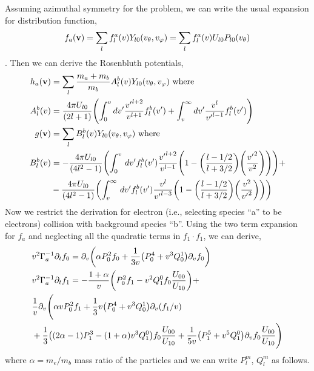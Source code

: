 \documentclass{article}[draft]
\begin{document}
Assuming azimuthal symmetry for the problem, we can write the usual expansion for distribution function, 
\begin{align*}
	f_a\of{\vect{v}} = \sum_{l} f^{a}_l\of{v} Y_{l0}\of{\vtheta, \vphi} = \sum_{l} f^{a}_l\of{v} U_{l0} P_{l0}\of{\vtheta}
\end{align*}. Then we can derive \cite{rosenbluth1957fokker} the Rosenbluth potentials, 
\begin{align*}
	h_a\of{\vect{v}} &= \sum_{l} \frac{m_a + m_b}{m_b} A^{b}_l\of{v} Y_{l0}\of{\vtheta, \vphi} \text{ where } \\
	A^{b}_l\of{v} &= \frac{4\pi U_{l0}}{(2l+1)}\of{\int_{0}^{v} dv^\prime \frac{{v^\prime}^{l+2}}{v^{l+1}} f^{b}_l\of{v^\prime} +  \int_{v}^{\infty} dv^\prime \frac{{v}^{l}}{{v^\prime}^{l-1}} f^{b}_l\of{v^\prime}}\\
	g\of{\vect{v}} & = \sum_{l} B^{b}_l\of{v} Y_{l0}\of{\vtheta, \vphi} \text{ where }\\
	B^{b}_{l}\of{v} & = -\frac{4\pi U_{l0}}{(4l^2-1)} \of
	{
		\int_{0}^{v} \diff{v^\prime} f^{b}_l\of{v^\prime} \frac{{v^\prime}^{l+2}}{v^{l-1}} \of{1 - \of{\frac{l-1/2}{l+3/2}}\of{\frac{{v^\prime}^2 }{v^2}}} } + \\
	&-\frac{4\pi U_{l0}}{(4l^2-1)} \of{
		\int_{v}^{\infty} \diff{v^\prime} f^{b}_l\of{v^\prime} \frac{{v}^{l}}{{v^\prime}^{l-3}} \of{1 - \of{\frac{l-1/2}{l+3/2}}\of{\frac{{v}^2 }{{v^\prime}^2}}}
	}
\end{align*}
\newpage
Now we restrict the derivation for electron (i.e., selecting species ``a'' to be electrons) collision with background species ``b''. Using the two term expansion for $f_a$ and neglecting all  the quadratic terms in $f_1 \cdot f_1$, we can derive, 
\begin{align*}
&v^2	\Gamma_a ^{-1} \partial_t f_0  = \partial_v \of {\alpha P^2_0 f_0 + \frac{1}{3v}\of{P^4_0 + v^3 Q^1_0} \partial_v f_0}\\
&v^2	\Gamma_a ^{-1} \partial_t f_1  = -\frac{1+\alpha}{v} \of{P^2_0 f_1 -v^2 Q^0_1 f_0 \frac{U_{00}}{U_{10}}} + \\
&\frac{1}{v}\partial_v \Bigg(\alpha v P^2_0 f_1 + \frac{1}{3} v\of{P^4_0 + v^3 Q^1_0} \partial_v \of{f_1/v} \\
&+ \frac{1}{3}\of{(2\alpha -1 ) P^3_1 - (1 + \alpha) v^3 Q^0_1}f_0 \frac{U_{00}}{U_{10}} + \frac{1}{5v}\of{P^5_1 + v^5 Q^0_1} \partial_v f_0 \frac{U_{00}}{U_{10}}\Bigg)
\end{align*} where $\alpha = m_e/m_b$ mass ratio of the particles and we can write $P^{m}_l$, $Q^{m}_l$ as follows. 
\end{document}

